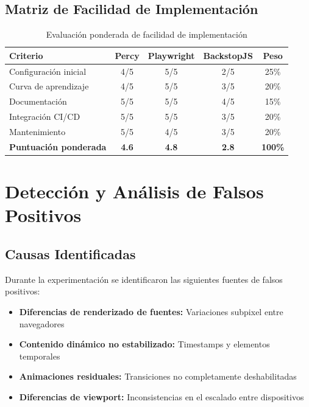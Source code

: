\documentclass{article}
\begin{document}

\subsection{Matriz de Facilidad de Implementación}

\begin{table}[H]
\centering
\begin{tabular}{|l|c|c|c|c|}
\hline
\textbf{Criterio} & \textbf{Percy} & \textbf{Playwright} & \textbf{BackstopJS} & \textbf{Peso} \\
\hline
Configuración inicial & 4/5 & 5/5 & 2/5 & 25\% \\
Curva de aprendizaje & 4/5 & 5/5 & 3/5 & 20\% \\
Documentación & 5/5 & 5/5 & 4/5 & 15\% \\
Integración CI/CD & 5/5 & 5/5 & 3/5 & 20\% \\
Mantenimiento & 5/5 & 4/5 & 3/5 & 20\% \\
\hline
\textbf{Puntuación ponderada} & \textbf{4.6} & \textbf{4.8} & \textbf{2.8} & \textbf{100\%} \\
\hline
\end{tabular}
\caption{Evaluación ponderada de facilidad de implementación}
\label{tab:implementation}
\end{table}

\section{Detección y Análisis de Falsos Positivos}

\subsection{Causas Identificadas}
Durante la experimentación se identificaron las siguientes fuentes de falsos positivos:

\begin{itemize}[nosep]
\item \textbf{Diferencias de renderizado de fuentes:} Variaciones subpixel entre navegadores
\item \textbf{Contenido dinámico no estabilizado:} Timestamps y elementos temporales
\item \textbf{Animaciones residuales:} Transiciones no completamente deshabilitadas
\item \textbf{Diferencias de viewport:} Inconsistencias en el escalado entre dispositivos
\end{itemize}
\end{document}
